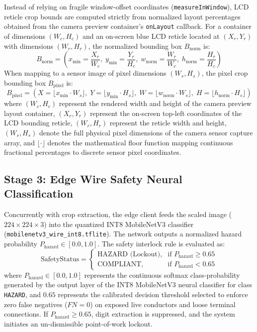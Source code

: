 \documentclass[12pt,a4paper,oneside]{report}
\begin{document}
Instead of relying on fragile window-offset coordinates (\texttt{measureInWindow}), LCD reticle crop bounds are computed strictly from normalized layout percentages obtained from the camera preview container's \texttt{onLayout} callback. For a container of dimensions $(W_c, H_c)$ and an on-screen blue LCD reticle located at $(X_r, Y_r)$ with dimensions $(W_r, H_r)$, the normalized bounding box $B_{\text{norm}}$ is:
\begin{equation}
B_{\text{norm}} = \left( x_{\text{min}} = \frac{X_r}{W_c},\; y_{\text{min}} = \frac{Y_r}{H_c},\; w_{\text{norm}} = \frac{W_r}{W_c},\; h_{\text{norm}} = \frac{H_r}{H_c} \right)
\end{equation}
When mapping to a sensor image of pixel dimensions $(W_s, H_s)$, the pixel crop bounding box $B_{\text{pixel}}$ is:
\begin{equation}
B_{\text{pixel}} = \left( X = \lfloor x_{\text{min}} \cdot W_s \rfloor,\; Y = \lfloor y_{\text{min}} \cdot H_s \rfloor,\; W = \lfloor w_{\text{norm}} \cdot W_s \rfloor,\; H = \lfloor h_{\text{norm}} \cdot H_s \rfloor \right)
\end{equation}
where $(W_c, H_c)$ represent the rendered width and height of the camera preview layout container, $(X_r, Y_r)$ represent the on-screen top-left coordinates of the LCD bounding reticle, $(W_r, H_r)$ represent the reticle width and height, $(W_s, H_s)$ denote the full physical pixel dimensions of the camera sensor capture array, and $\lfloor \cdot \rfloor$ denotes the mathematical floor function mapping continuous fractional percentages to discrete sensor pixel coordinates.

\subsection{Stage 3: Edge Wire Safety Neural Classification}
Concurrently with crop extraction, the edge client feeds the scaled image ($224\times 224\times 3$) into the quantized INT8 MobileNetV3 classifier (\texttt{mobilenetv3\_wire\_int8.tflite}). The network outputs a normalized hazard probability $P_{\text{hazard}} \in [0.0, 1.0]$. The safety interlock rule is evaluated as:
\begin{equation}
\text{SafetyStatus} = 
\begin{cases}
\text{HAZARD (Lockout)}, & \text{if } P_{\text{hazard}} \ge 0.65 \\
\text{COMPLIANT}, & \text{if } P_{\text{hazard}} < 0.65
\end{cases}
\end{equation}
where $P_{\text{hazard}} \in [0.0, 1.0]$ represents the continuous softmax class-probability generated by the output layer of the INT8 MobileNetV3 neural classifier for class \texttt{HAZARD}, and $0.65$ represents the calibrated decision threshold selected to enforce zero false negatives ($FN = 0$) on exposed live conductors and loose terminal connections. If $P_{\text{hazard}} \ge 0.65$, digit extraction is suppressed, and the system initiates an un-dismissible point-of-work lockout.
\end{document}
